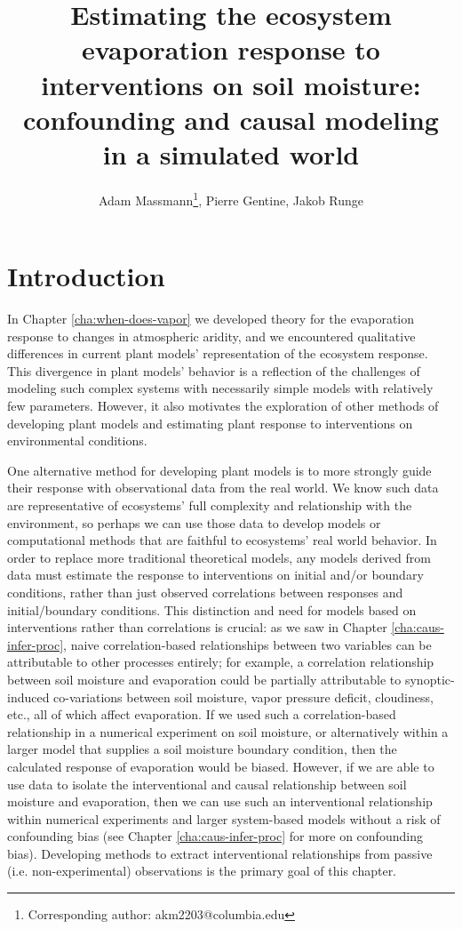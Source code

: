 \documentclass[12pt]{article}
\begin{document}
\title{Estimating the ecosystem evaporation response to interventions
  on soil moisture: confounding and causal modeling in a simulated
  world}

\author{Adam Massmann\thanks{Corresponding author:
    akm2203@columbia.edu}, Pierre Gentine, Jakob Runge}

\maketitle

\section{Introduction}

In Chapter \ref{cha:when-does-vapor} we developed theory for the
evaporation response to changes in atmospheric aridity, and we
encountered qualitative differences in current plant models'
representation of the ecosystem response. This divergence in plant
models' behavior is a reflection of the challenges of modeling such
complex systems with necessarily simple models with relatively few
parameters. However, it also motivates the exploration of other
methods of developing plant models and estimating plant response to
interventions on environmental conditions.

One alternative method for developing plant models is to more strongly
guide their response with observational data from the real world. We
know such data are representative of ecosystems' full complexity and
relationship with the environment, so perhaps we can use those data to
develop models or computational methods that are faithful to
ecosystems' real world behavior. In order to replace more traditional
theoretical models, any models derived from data must estimate the
response to interventions on initial and/or boundary conditions,
rather than just observed correlations between responses and
initial/boundary conditions. This distinction and need for models
based on interventions rather than correlations is crucial: as we saw
in Chapter \ref{cha:caus-infer-proc}, naive correlation-based
relationships between two variables can be attributable to other
processes entirely; for example, a correlation relationship between
soil moisture and evaporation could be partially attributable to
synoptic-induced co-variations between soil moisture, vapor pressure
deficit, cloudiness, etc., all of which affect evaporation. If we used
such a correlation-based relationship in a numerical experiment on
soil moisture, or alternatively within a larger model that supplies a
soil moisture boundary condition, then the calculated response of
evaporation would be biased. However, if we are able to use data to
isolate the interventional and causal relationship between soil
moisture and evaporation, then we can use such an interventional
relationship within numerical experiments and larger system-based
models without a risk of confounding bias (see Chapter
\ref{cha:caus-infer-proc} for more on confounding bias). Developing
methods to extract interventional relationships from passive
(i.e. non-experimental) observations is the primary goal of this
chapter.
\end{document}
